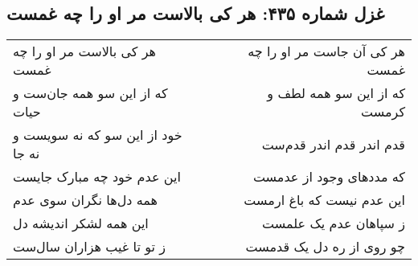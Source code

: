 \begin{center}
\section*{غزل شماره ۴۳۵: هر کی بالاست مر او را چه غمست}
\label{sec:0435}
\begin{longtable}{l p{0.5cm} r}
هر کی بالاست مر او را چه غمست
&&
هر کی آن جاست مر او را چه غمست
\\
که از این سو همه جان‌ست و حیات
&&
که از این سو همه لطف و کرمست
\\
خود از این سو که نه سویست و نه جا
&&
قدم اندر قدم اندر قدم‌ست
\\
این عدم خود چه مبارک جایست
&&
که مددهای وجود از عدمست
\\
همه دل‌ها نگران سوی عدم
&&
این عدم نیست که باغ ارمست
\\
این همه لشکر اندیشه دل
&&
ز سپاهان عدم یک علمست
\\
ز تو تا غیب هزاران سال‌ست
&&
چو روی از ره دل یک قدمست
\\
\end{longtable}
\end{center}

